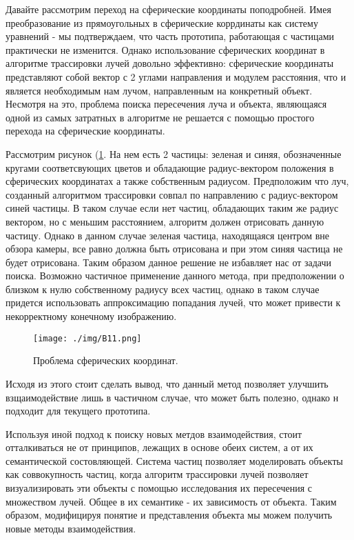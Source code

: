 Давайте рассмотрим переход на сферические координаты поподробней. Имея преобразование из прямоугольных в сферические коррдинаты как систему уравнений - мы подтверждаем, что часть прототипа, работающая с частицами практически не изменится. Однако использование сферических координат в алгоритме трассировки лучей довольно эффективно: сферические координаты представляют собой вектор с 2 углами направления и модулем расстояния, что и является необходимым нам лучом, направленным на конкретный объект. Несмотря на это, проблема поиска пересечения луча и объекта, являющаяся одной из самых затратных в алгоритме не решается с помощью простого перехода на сферические координаты.

Рассмотрим рисунок (\ref{pic:B11}. На нем есть 2 частицы: зеленая и синяя, обозначенные кругами соответсвующих цветов и обладающие радиус-вектором положения в сферических координатах а также собственным радиусом. Предположим что луч, созданный алгоритмом трассировки совпал по направлению с радиус-вектором синей частицы. В таком случае если нет частиц, обладающих таким же радиус вектором, но с меньшим расстоянием, алгоритм должен отрисовать данную частицу. Однако в данном случае зеленая частица, находящаяся центром вне обзора камеры, все равно должна быть отрисована и при этом синяя частица не будет отрисована. Таким образом данное решение не избавляет нас от задачи поиска. Возможно частичное применение данного метода, при предположении о близком к нулю собственному радиусу всех частиц, однако в таком случае придется использовать аппроксимацию попадания лучей, что может привести к некорректному конечному изображению.


\begin{figure} 
\begin{center}
\texttt{[image: ./img/B11.png]}
\end{center}
\caption{Проблема сферических координат.}
\label{pic:B11}
\end{figure}

Исходя из этого стоит сделать вывод, что данный метод позволяет улучшить взщаимодействие лишь в частичном случае, что может быть полезно, однако н подходит для текущего прототипа.

Используя иной подход к поиску новых метдов взаимодействия, стоит отталкиваться не от принципов, лежащих в основе обеих систем, а от их семантической состовляющей. Система частиц позволяет моделировать объекты как соввокупность частиц, когда алгоритм трассировки лучей позволяет визуализировать эти объекты с помощью исследования их пересечения с множеством лучей. Общее в их семантике  - их зависимость от объекта. Таким образом, модифицируя понятие и представления объекта мы можем получить новые методы взаимодействия. 

